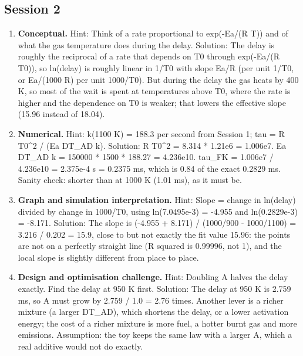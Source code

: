 \documentclass[11pt,a4paper]{article}
\begin{document}
\subsection*{Session 2}
\begin{enumerate}[nosep]
\item \textbf{Conceptual.} Hint: Think of a rate proportional to exp(-Ea/(R T)) and of what the gas temperature does during the delay. Solution: The delay is roughly the reciprocal of a rate that depends on T0 through exp(-Ea/(R T0)), so ln(delay) is roughly linear in 1/T0 with slope Ea/R (per unit 1/T0, or Ea/(1000 R) per unit 1000/T0). But during the delay the gas heats by 400 K, so most of the wait is spent at temperatures above T0, where the rate is higher and the dependence on T0 is weaker; that lowers the effective slope (15.96 instead of 18.04).
\item \textbf{Numerical.} Hint: k(1100 K) = 188.3 per second from Session 1; tau = R T0\textasciicircum{}2 / (Ea DT\_AD k). Solution: R T0\textasciicircum{}2 = 8.314 * 1.21e6 = 1.006e7. Ea DT\_AD k = 150000 * 1500 * 188.27 = 4.236e10. tau\_FK = 1.006e7 / 4.236e10 = 2.375e-4 s = 0.2375 ms, which is 0.84 of the exact 0.2829 ms. Sanity check: shorter than at 1000 K (1.01 ms), as it must be.
\item \textbf{Graph and simulation interpretation.} Hint: Slope = change in ln(delay) divided by change in 1000/T0, using ln(7.0495e-3) = -4.955 and ln(0.2829e-3) = -8.171. Solution: The slope is (-4.955 + 8.171) / (1000/900 - 1000/1100) = 3.216 / 0.202 = 15.9, close to but not exactly the fit value 15.96: the points are not on a perfectly straight line (R squared is 0.99996, not 1), and the local slope is slightly different from place to place.
\item \textbf{Design and optimisation challenge.} Hint: Doubling A halves the delay exactly. Find the delay at 950 K first. Solution: The delay at 950 K is 2.759 ms, so A must grow by 2.759 / 1.0 = 2.76 times. Another lever is a richer mixture (a larger DT\_AD), which shortens the delay, or a lower activation energy; the cost of a richer mixture is more fuel, a hotter burnt gas and more emissions. Assumption: the toy keeps the same law with a larger A, which a real additive would not do exactly.
\end{enumerate}
\end{document}
